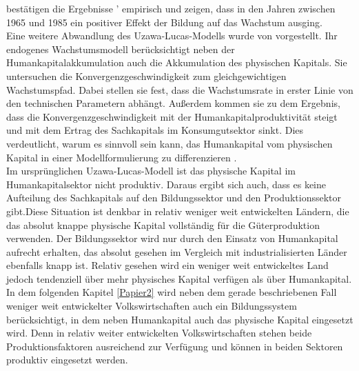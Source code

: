 \citet{SalaiMartin.1996} best{\"a}tigen die Ergebnisse \citeauthor{Lucas.1988}' \citeyear{Lucas.1988} empirisch und zeigen, dass in den Jahren zwischen 1965 und 1985 ein positiver Effekt der Bildung auf das Wachstum ausging.\\
Eine weitere Abwandlung des Uzawa-Lucas-Modells wurde von \citet{Ortigueira.1997} vorgestellt. Ihr endogenes Wachstumsmodell ber{\"u}cksichtigt neben der Humankapitalakkumulation auch die Akkumulation des physischen Kapitals. Sie untersuchen die Konvergenzgeschwindigkeit zum gleichgewichtigen Wachstumspfad. Dabei stellen sie fest, dass die Wachstumsrate in erster Linie von den technischen Parametern abh{\"a}ngt. Au{\ss}erdem kommen sie zu dem Ergebnis, dass die Konvergenzgeschwindigkeit mit der Humankapitalproduktivit{\"a}t steigt und mit dem Ertrag des Sachkapitals im Konsumgutsektor sinkt. Dies verdeutlicht, warum es sinnvoll sein kann, das Humankapital vom physischen Kapital in einer Modellformulierung zu differenzieren \citep{Ortigueira.1997}.\\
\newline
Im ursprünglichen Uzawa-Lucas-Modell ist das physische Kapital im Humankapitalsektor nicht produktiv. Daraus ergibt sich auch, dass es keine Aufteilung des Sachkapitals auf den Bildungssektor und den Produktionssektor gibt.\newline Diese Situation ist denkbar in relativ weniger weit entwickelten L{\"a}ndern, die das absolut knappe physische Kapital vollst{\"a}ndig f{\"u}r die G{\"u}terproduktion verwenden. Der Bildungssektor wird nur durch den Einsatz von Humankapital aufrecht erhalten, das absolut gesehen im Vergleich mit industrialisierten L{\"a}nder ebenfalls knapp ist. Relativ gesehen wird ein weniger weit entwickeltes Land jedoch tendenziell {\"u}ber mehr physisches Kapital verf{\"u}gen als {\"u}ber Humankapital. \newline In dem folgenden Kapitel \ref{Papier2} wird neben dem gerade beschriebenen Fall weniger weit entwickelter Volkswirtschaften auch ein Bildungssystem berücksichtigt, in dem neben Humankapital auch das physische Kapital eingesetzt wird. Denn in relativ weiter entwickelten Volkswirtschaften stehen beide Produktionsfaktoren ausreichend zur Verf{\"u}gung und können in beiden Sektoren produktiv eingesetzt werden.


